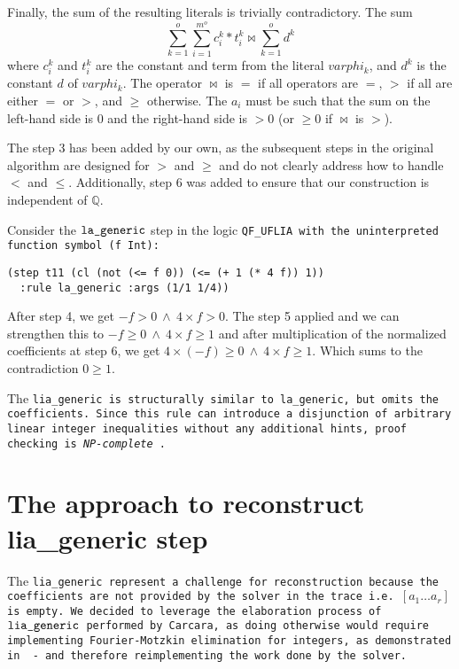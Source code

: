 Finally, the sum of the resulting literals is trivially contradictory.
The sum
\[
    \sum_{k=1}^{o}\sum_{i=1}^{m^o}c_i^k*t_i^k \bowtie \sum_{k=1}^{o}d^k
\]
where $c_i^k$ and $t_i^k$ are the constant and term from the literal $varphi_k$, and $d^k$ is the constant $d$ of $varphi_k$.
The operator $\bowtie$ is $=$ if all operators are $=$, $>$ if all are either $=$ or $>$, and $\geq$ otherwise. The $a_i$ must be such
that the sum on the left-hand side is $0$ and the right-hand side is $>0$ (or $\geq 0$ if $\bowtie$ is $>$).

The step 3 has been added by our own, as the subsequent steps in the original algorithm are designed for $>$ and $\geq$ and do not clearly address how to handle $<$ and $\leq$.
Additionally, step 6  was added to ensure that our construction is independent of $\mathbb{Q}$.

\begin{example}
Consider the $\tt{la\_generic}$ step in the logic \tt{QF\_UFLIA} with the uninterpreted function symbol \lstinline[language=SMT]|(f Int)|:
\begin{lstlisting}[language=SMT,label={lst:smtexampleinput}]
(step t11 (cl (not (<= f 0)) (<= (+ 1 (* 4 f)) 1))
  :rule la_generic :args (1/1 1/4))
\end{lstlisting}
After step 4, we get $- f > 0 ~\land~ 4 \times f > 0$. The step 5 applied and we can strengthen this to
$- f \geq 0 ~\land~ 4 \times f \geq 1$ and after multiplication of the normalized coefficients at step 6, we get $4 \times(- f) \geq 0 ~\land~ 4 \times f \geq 1$.
Which sums to the contradiction  $0 \geq 1$. 
\end{example}


The \tt{lia\_generic} is structurally similar to \tt{la\_generic}, but omits the coefficients.
Since this rule can introduce a disjunction of arbitrary linear integer inequalities without any additional hints, proof checking is \emph{NP-complete} \cite{Schrijver:lia}.

\section{The approach to reconstruct lia\_generic step}

The \tt{lia\_generic} represent a challenge for reconstruction because the coefficients are not provided by the solver in the trace i.e. \colorbox{orange!30}{$[a_1 \dots a_r]$} is empty.
We decided to leverage the elaboration process of $\tt{lia\_generic}$ performed by Carcara, as doing otherwise would require implementing Fourier-Motzkin elimination for integers, as demonstrated in \cite{omegatest,micromega} -
and therefore reimplementing the work done by the solver.

